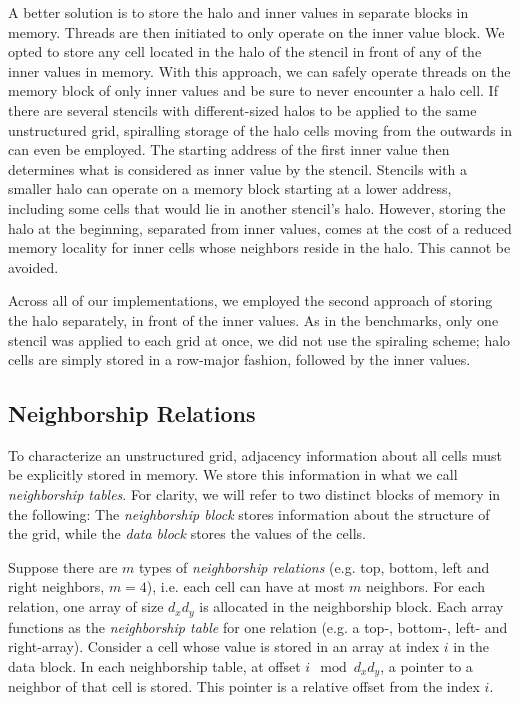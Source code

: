 A better solution is to store the halo and inner values in separate blocks in memory. Threads are then initiated to only operate on the inner value block. We opted to store any cell located in the halo of the stencil in front of any of the inner values in memory. With this approach, we can safely operate threads on the memory block of only inner values and be sure to never encounter a halo cell. If there are several stencils with different-sized halos to be applied to the same unstructured grid, spiralling storage of the halo cells moving from the outwards in can even be employed. The starting address of the first inner value then determines what is considered as inner value by the stencil. Stencils with a smaller halo can operate on a memory block starting at a lower address, including some cells that would lie in another stencil's halo. However, storing the halo at the beginning, separated from inner values, comes at the cost of a reduced memory locality for inner cells whose neighbors reside in the halo. This cannot be avoided.

Across all of our implementations, we employed the second approach of storing the halo separately, in front of the inner values. As in the benchmarks, only one stencil was applied to each grid at once, we did not use the spiraling scheme; halo cells are simply stored in a row-major fashion, followed by the inner values.

\subsection{Neighborship Relations}
\label{sec:unstructured-neighborships}

To characterize an unstructured grid, adjacency information about all cells must be explicitly stored in memory. We store this information in what we call \emph{neighborship tables}.  For clarity, we will refer to two distinct blocks of memory in the following: The \emph{neighborship block} stores information about the structure of the grid, while the \emph{data block} stores the values of the cells.

Suppose there are $m$ types of \emph{neighborship relations} (e.g. top, bottom, left and right neighbors, $m=4$), i.e. each cell can have at most $m$ neighbors. For each relation, one array of size $d_xd_y$ is allocated in the neighborship block. Each array functions as the \emph{neighborship table} for one relation (e.g. a top-, bottom-, left- and right-array). Consider a cell whose value is stored in an array at index $i$ in the data block. In each neighborship table, at offset $i \mod d_xd_y$, a pointer to a neighbor of that cell is stored. This pointer is a relative offset from the index $i$.

